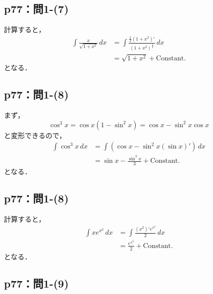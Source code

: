 \documentclass[uplatex,dvipdfmx,a4paper,10pt,fleqn]{jsarticle}
\begin{document}
\subsection*{p77：問1-(7)}

\begin{tleftbar}
    計算すると，
    \begin{align*} 
        \int \frac{x}{\sqrt{1+x^2}} \, dx & = \int \frac{\frac{1}{2}(1+x^2)'}{(1+x^2)^\frac{1}{2}} \, dx \\
        & = \sqrt{1+x^2}+\mathrm{Constant.}
    \end{align*}
    となる．
\end{tleftbar}

\subsection*{p77：問1-(8)}

\begin{tleftbar}
    まず，
    \[
        \cos ^3 x = \cos x (1-\sin ^2 x) = \cos x - \sin ^2 x \cos x 
    \]
    と変形できるので，
    \begin{align*} 
        \int \cos ^3 x \, dx & = \int (\cos x - \sin ^2 x (\sin x)' ) \, dx \\
        & = \sin x -\frac{\sin ^3 x}{3} + \mathrm{Constant.}
    \end{align*}
        となる．
\end{tleftbar}


\subsection*{p77：問1-(8)}

\begin{tleftbar}
    計算すると，
    \begin{align*} 
        \int x e^{x^2} \, dx & = \int \frac{(x^2)' e^{x^2}}{2} \, dx \\
        & = \frac{e^{x^2}}{2}+\mathrm{Constant.}
    \end{align*} 
    となる．
\end{tleftbar}


\subsection*{p77：問1-(9)}
\end{document}
